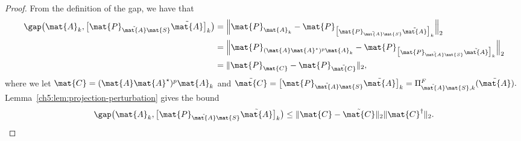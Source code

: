 \begin{proof}
From the definition of the gap, we have that 
\begin{align*}
\gap\big(\mat{A}_k, \big[ \mat{P}_{\tilde{\mat{A}}\mat{S}} \tilde{\mat{A}}
\big]_k \big) & = \Big\| \mat{P}_{\mat{A}_k} - \mat{P}_{
\big[\mat{P}_{\tilde{\mat{A}}\mat{S}} \tilde{\mat{A}} \big]_k} \Big\|_2 \\
& = \Big\| \mat{P}_{(\mat{A}\mat{A}^\star)^p \mat{A}_k} - \mat{P}_{
\big[\mat{P}_{\tilde{\mat{A}}\mat{S}} \tilde{\mat{A}} \big]_k} \Big\|_2 \\
& = \| \mat{P}_{\mat{C}} - \mat{P}_{\tilde{\mat{C}}}\|_2,
\end{align*}
where we let $\mat{C} = (\mat{A} \mat{A}^\star)^p \mat{A}_k$ and
$\tilde{\mat{C}} = \big[\mat{P}_{\tilde{\mat{A}}\mat{S}} \tilde{\mat{A}} \big]_k
= \Pi^F_{\tilde{\mat{A}}\mat{S},k}(\tilde{\mat{A}}).$
Lemma~\ref{ch5:lem:projection-perturbation} gives the bound
\begin{equation}
\label{ch5:eqn:golub-zha-perturbation-result} 
\gap\big(\mat{A}_k, \big[ \mat{P}_{\tilde{\mat{A}}\mat{S}} \tilde{\mat{A}}
\big]_k \big) \leq \|\mat{C} - \tilde{\mat{C}}\|_2 \|\mat{C}^\dagger\|_2.
\end{equation}


\end{proof}
